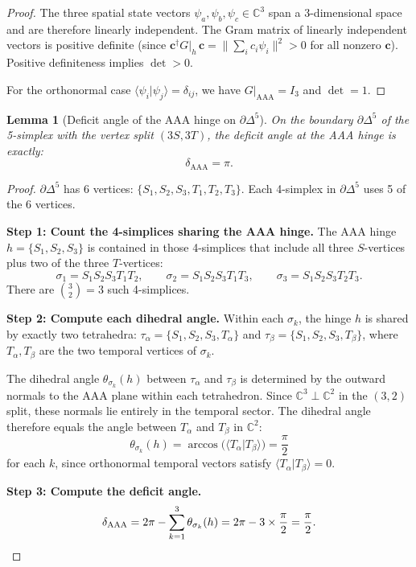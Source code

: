 \documentclass[12pt]{article}
\newtheorem{lemma}[theorem]{Lemma}
\theoremstyle{remark}
\theoremstyle{definition}
\newcommand{\CC}{\mathbb{C}}
\begin{document}
\begin{proof}
The three spatial state vectors $\psi_a, \psi_b, \psi_c \in \CC^3$
span a 3-dimensional space and are therefore linearly independent.
The Gram matrix of linearly independent vectors is positive definite
(since $\mathbf{c}^\dagger G|_h\, \mathbf{c} =
\|\sum_i c_i \psi_i\|^2 > 0$ for all nonzero $\mathbf{c}$).
Positive definiteness implies $\det > 0$.

For the orthonormal case $\langle \psi_i | \psi_j \rangle = \delta_{ij}$,
we have $G|_{\mathrm{AAA}} = I_3$ and $\det = 1$.
\end{proof}

\begin{lemma}[Deficit angle of the AAA hinge on $\partial\Delta^5$]
\label{lem:delta}
On the boundary $\partial\Delta^5$ of the 5-simplex with the vertex
split $(3S, 3T)$, the deficit angle at the AAA hinge is exactly:
\begin{equation}
\boxed{\delta_{\mathrm{AAA}} = \pi.}
\end{equation}
\end{lemma}

\begin{proof}
$\partial\Delta^5$ has 6 vertices: $\{S_1, S_2, S_3, T_1, T_2, T_3\}$.
Each 4-simplex in $\partial\Delta^5$ uses 5 of the 6 vertices.

\medskip\noindent
\textbf{Step 1: Count the 4-simplices sharing the AAA hinge.}
The AAA hinge $h = \{S_1, S_2, S_3\}$ is contained in those 4-simplices
that include all three $S$-vertices plus two of the three $T$-vertices:
\begin{equation}
\sigma_1 = S_1 S_2 S_3 T_1 T_2, \qquad
\sigma_2 = S_1 S_2 S_3 T_1 T_3, \qquad
\sigma_3 = S_1 S_2 S_3 T_2 T_3.
\end{equation}
There are $\binom{3}{2} = 3$ such 4-simplices.

\medskip\noindent
\textbf{Step 2: Compute each dihedral angle.}
Within each $\sigma_k$, the hinge $h$ is shared by exactly two
tetrahedra: $\tau_\alpha = \{S_1, S_2, S_3, T_\alpha\}$ and
$\tau_\beta = \{S_1, S_2, S_3, T_\beta\}$, where $T_\alpha, T_\beta$
are the two temporal vertices of $\sigma_k$.

The dihedral angle $\theta_{\sigma_k}(h)$ between $\tau_\alpha$ and
$\tau_\beta$ is determined by the outward normals to the AAA plane
within each tetrahedron. Since $\CC^3 \perp \CC^2$ in
the $(3,2)$ split, these normals lie entirely in the temporal sector.
The dihedral angle therefore equals the angle between $T_\alpha$ and
$T_\beta$ in $\CC^2$:
\begin{equation}
\theta_{\sigma_k}(h) =
\arccos\bigl(\langle T_\alpha | T_\beta \rangle\bigr) = \frac{\pi}{2}
\end{equation}
for each $k$, since orthonormal temporal vectors satisfy
$\langle T_\alpha | T_\beta \rangle = 0$.

\medskip\noindent
\textbf{Step 3: Compute the deficit angle.}
\begin{equation}
\delta_{\mathrm{AAA}} = 2\pi - \sum_{k=1}^{3} \theta_{\sigma_k}(h)
= 2\pi - 3 \times \frac{\pi}{2} = \frac{\pi}{2}. \qedhere
\end{equation}
\end{proof}
\end{document}
